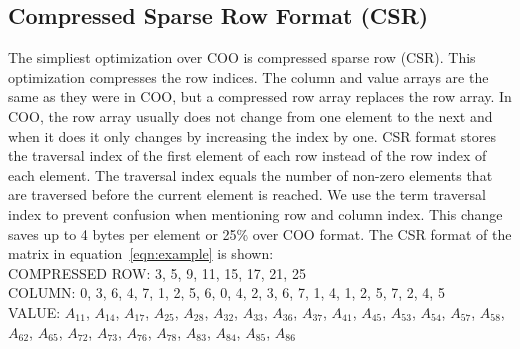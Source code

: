 \subsection{Compressed Sparse Row Format (CSR)}
\label{sec:csr}
The simpliest optimization over COO is compressed sparse row (CSR). This optimization compresses the row indices. The column and value arrays are the same as they were in COO, but a compressed row array replaces the row array. In COO, the row array usually does not change from one element to the next and when it does it only changes by increasing the index by one. CSR format stores the traversal index of the first element of each row instead of the row index of each element. The traversal index equals the number of non-zero elements that are traversed before the current element is reached. We use the term traversal index to prevent confusion when mentioning row and column index. This change saves up to 4 bytes per element or 25\% over COO format. The CSR format of the matrix in equation~\ref{eqn:example} is shown: \\
COMPRESSED ROW: 3, 5, 9, 11, 15, 17, 21, 25 \\
COLUMN: 0, 3, 6, 4, 7, 1, 2, 5, 6, 0, 4, 2, 3, 6, 7, 1, 4, 1, 2, 5, 7, 2, 4, 5\\ 
VALUE: $A_{11}$, $A_{14}$, $A_{17}$, $A_{25}$, $A_{28}$, $A_{32}$, $A_{33}$, $A_{36}$, $A_{37}$, $A_{41}$, $A_{45}$, $A_{53}$, $A_{54}$, $A_{57}$, $A_{58}$, $A_{62}$, $A_{65}$, $A_{72}$, $A_{73}$, $A_{76}$, $A_{78}$, $A_{83}$, $A_{84}$, $A_{85}$, $A_{86}$ \par
